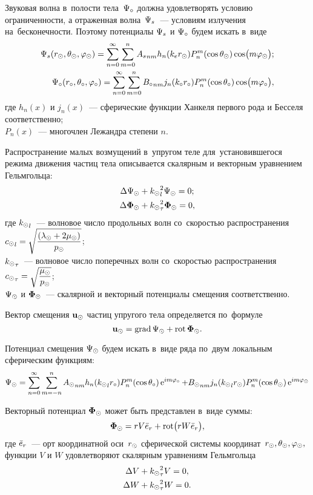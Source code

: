 Звуковая волна в~полости тела~$\P\c$ должна удовлетворять условию ограниченности, а отраженная волна~$\P\sc$~--- условиям излучения на~бесконечности. Поэтому потенциалы $\P\sc$ и $\P\c$ будем искать в~виде 
\begin{align}\P\sc(r\s, \Q\s, \f\s) = \sum\limits_{n = 0}^\infty \sum\limits_{m = 0}^n {A\sc}_{nm} h_n(k\en r\s) P_n^m(\cos\Q\s)\cos\bigl(m\f\s\bigr);\\
\P\c(r\c, \Q\c, \f\c) = \sum\limits_{n = 0}^\infty \sum\limits_{m = 0}^n {B\c}_{nm} j_n(k\c r\c) P_n^m(\cos\Q\c)\cos\bigl(m\f\c\bigr),
\end{align}
где $h_n(x)$ и $j_n(x)$~--- сферические функции Ханкеля первого рода и Бесселя соответственно; \\
$P_n(x)$~--- многочлен Лежандра степени $n$.

Распространение малых возмущений в~упругом теле для~установившегося режима движения частиц тела описывается скалярным и векторным уравнением Гельмгольца:
\begin{align}
\Lap\P\s &+ {k\s}_l^2\P\s = 0;\label{Helmholtz_scalar}\\
\Lap\F\s &+ {k\s}_\t^2\F\s = 0,\label{Helmholtz_vector}
\end{align}
где ${k\s}_l$~--- волновое число продольных волн со~скоростью распространения \break 
${c\s}_l = \sqrt{\df{(\la\s + 2\mu\s)}{p\s}}$;\\
${k\s}_\t$~--- волновое число поперечных волн со~скоростью распространения \\
${c\s}_\t = \sqrt{\df{\mu\s}{p\s}}$;\\
$\P\s$ и $\F\s$~--- скалярной и векторный потенциалы смещения соответственно.

Вектор смещения $\mathbf{u}\s$ частиц упругого тела определяется по~формуле
$$
\mathbf{u}\s = \grad \P\s + \rot \F\s.
$$

Потенциал смещения $\P\s$ будем искать в~виде ряда по~двум локальным сферическим функциям:
$$
\P\s = \sum\limits_{n=0}^\infty \sum\limits_{m=-n}^n {A\s}_{nm} h_n({k\s}_lr\c)P_n^m(\cos\Q\c)\e^{im\f\c} + {B\s}_{nm} j_n({k\s}_lr\s)P_n^m(\cos\Q\s)\e^{im\f\s}
$$

Векторный потенциал $\F\s$ может быть представлен в~виде суммы:
$$
\F\s = rV\er + \rot\bigl(rW\er\bigr),
$$
где $\er$~--- орт координатной оси~$r\s$ сферической системы координат~$r\s, \Q\s, \f\s,$\\
функции $V$ и $W$ удовлетворяют скалярным уравнениям Гельмгольца
\begin{align}
\Lap V &+ {k\s}_\t^2 V = 0,\\
\Lap W &+ {k\s}_\t^2 W = 0.
\end{align}

